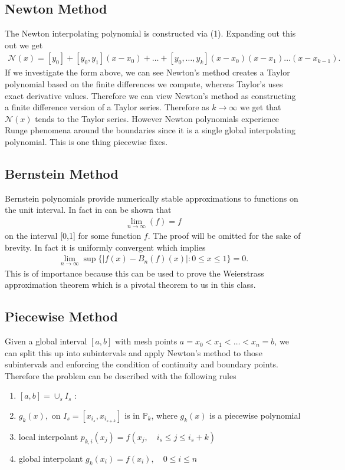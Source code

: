 \documentclass[12pt]{article}
\theoremstyle{remark}
\begin{document}
\subsection{Newton Method}

The Newton interpolating polynomial is constructed via (1). Expanding out this out we get 
\begin{align*}
	\mathcal{N}(x) = [y_0] + [y_0,y_1](x-x_0) + \ldots + [y_0,\ldots,y_k](x-x_0)(x-x_1)\ldots(x-x_{k-1}).
\end{align*}
If we investigate the form above, we can see Newton's method creates a Taylor polynomial based on the finite differences we compute, whereas Taylor's uses exact derivative values. Therefore we can view Newton's method as constructing a finite difference version of a Taylor series. Therefore as $k \rightarrow \infty$ we get that $\mathcal{N}(x)$ tends to the Taylor series. However Newton polynomials experience Runge phenomena around the boundaries since it is a single global interpolating polynomial. This is one thing piecewise fixes.

\subsection{Bernstein Method}

Bernstein polynomials provide numerically stable approximations to functions on the unit interval. In fact in can be shown that 
\begin{align*}
	\lim_{n \rightarrow \infty}(f) = f
\end{align*}
on the interval [0,1] for some function $f$. The proof will be omitted for the sake of brevity. In fact it is uniformly convergent which implies
\begin{align*}
			\lim_{n \rightarrow \infty} \sup \{\vert f(x) - B_n(f)(x) \vert: 0 \leq x \leq 1\} = 0.
\end{align*}
This is of importance because this can be used to prove the Weierstrass approximation theorem which is a pivotal theorem to us in this class.

\subsection{Piecewise Method}
Given a global interval $[a,b]$ with mesh points $a = x_0 < x_1 < \ldots < x_n = b$, we can split this up into subintervals and apply Newton's method to those subintervals and enforcing the condition of continuity and boundary points. Therefore the problem can be described with the following rules 
\begin{enumerate}
	\item $[a,b] = \cup_sI_s$ : 
	\item $g_k(x),$ on $I_s = [x_{i_s}, x_{i_{s+k}}]$ is in $\mathbb{P}_k$, where $g_k(x)$ is a piecewise polynomial
	\item local interpolant $p_{k,i}(x_j) = f(x_j, \quad i_s \leq j \leq i_s + k)$
	\item global interpolant $g_k(x_i) = f(x_i), \quad 0 \leq i \leq n$
\end{enumerate}
\end{document}
